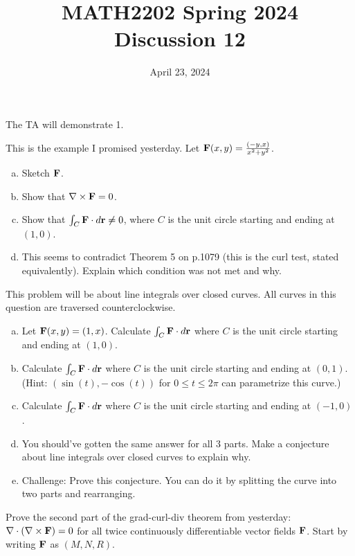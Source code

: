 \documentclass[11pt,oneside]{amsart}
\title{MATH2202 Spring 2024\\
Discussion 12}
\date{April 23, 2024}
\theoremstyle{definition}
\begin{document}
  \maketitle

  The TA will demonstrate 1.

  \begin{problem}
    This is the example I promised yesterday. Let $\mathbf F(x,y)=\frac{(-y,x)}{x^2+y^2}$.
    \begin{enumerate}[(a)]
      \item Sketch $\mathbf F$.
      \item Show that $\nabla\times \mathbf F=0$.
      \item Show that $\int_C\mathbf F\cdot d\mathbf r\neq 0$, where $C$ is the unit circle starting and ending at $(1,0)$.
      \item This seems to contradict Theorem 5 on p.1079 (this is the curl test, stated equivalently). Explain which condition was not met and why.
    \end{enumerate}
  \end{problem}

  \begin{problem}
    This problem will be about line integrals over closed curves. All curves in this question are traversed counterclockwise.
    \begin{enumerate}[(a)]
      \item Let $\mathbf F(x,y)=(1,x)$. Calculate $\int_C \mathbf F\cdot d\mathbf r$ where $C$ is the unit circle starting and ending at $(1,0)$.
      \item Calculate $\int_C \mathbf F\cdot d\mathbf r$ where $C$ is the unit circle starting and ending at $(0,1)$. (Hint: $(\sin(t),-\cos(t))$ for $0\leq t\leq 2\pi$ can parametrize this curve.)
      \item Calculate $\int_C \mathbf F\cdot d\mathbf r$ where $C$ is the unit circle starting and ending at $(-1,0)$.
      \item You should've gotten the same answer for all 3 parts. Make a conjecture about line integrals over closed curves to explain why.
      \item Challenge: Prove this conjecture. You can do it by splitting the curve into two parts and rearranging.
    \end{enumerate}
  \end{problem}

  \begin{problem}
    Prove the second part of the grad-curl-div theorem from yesterday: $\nabla\cdot(\nabla\times\mathbf F)=0$ for all twice continuously differentiable vector fields $\mathbf F$. Start by writing $\mathbf F$ as $(M,N,R)$.
  \end{problem}
\end{document}

